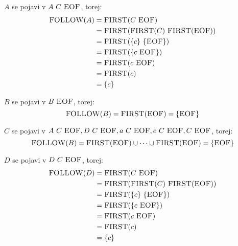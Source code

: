 \documentclass{article}
\newcommand{\FIRST}{\textsc{FIRST}}
\newcommand{\FOLLOW}{\textsc{FOLLOW}}
\newcommand{\EOF}{\textsc{EOF}}
\newcommand{\Seq}{\ }
\begin{document}
$A$ se pojavi v $A \Seq C \Seq \EOF$, torej:
\begin{align*}
  \FOLLOW(A) &= \FIRST(C \Seq \EOF) \\
             &= \FIRST(\FIRST(C) \Seq \FIRST(\EOF))\\
             &= \FIRST(\{c\} \Seq \{\EOF\})\\
             &= \FIRST(\{c \Seq \EOF\})\\
             &= \FIRST(c \Seq \EOF) \\
             &= \FIRST(c)\\
             &= \{c\}
\end{align*}

$B$ se pojavi v $B \Seq \EOF$, torej:
\begin{equation*}
  \FOLLOW(B) = \FIRST(\EOF) = \{\EOF\}
\end{equation*}

$C$ se pojavi v $A \Seq C \Seq \EOF, D \Seq C \Seq \EOF, a \Seq C \Seq \EOF, e \Seq C \Seq \EOF, C \Seq \EOF$, torej:
\begin{equation*}
  \FOLLOW(B) = \FIRST(\EOF) \cup \dots \cup \FIRST(\EOF) = \{\EOF\}
\end{equation*}

$D$ se pojavi v $D \Seq C \Seq \EOF$, torej:
\begin{align*}
  \FOLLOW(D) &= \FIRST(C \Seq \EOF) \\
             &= \FIRST(\FIRST(C) \Seq \FIRST(\EOF))\\
             &= \FIRST(\{c\} \Seq \{\EOF\})\\
             &= \FIRST(\{c \Seq \EOF\})\\
             &= \FIRST(c \Seq \EOF) \\
             &= \FIRST(c)\\
             &= \{c\}
\end{align*}
\end{document}
